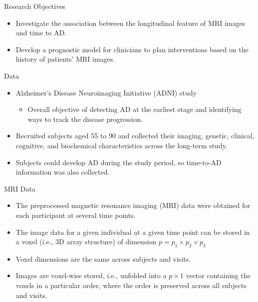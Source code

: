 \documentclass[
  ignorenonframetext,
]{beamer}
\providecommand{\tightlist}{%
  \setlength{\itemsep}{0pt}\setlength{\parskip}{0pt}}
\begin{document}
\begin{frame}{Research Objectives}
\protect\hypertarget{research-objectives}{}
\begin{itemize}
\item
  Investigate the association between the longitudinal feature of MRI
  images and time to AD.
\item
  Develop a prognostic model for clinicians to plan interventions based
  on the history of patients' MRI images.
\end{itemize}
\end{frame}

\begin{frame}{Data}
\protect\hypertarget{data}{}
\begin{itemize}
\item
  Alzheimer's Disease Neuroimaging Initiative (ADNI) study

  \begin{itemize}
  \tightlist
  \item
    Overall objective of detecting AD at the earliest stage and
    identifying ways to track the disease progression.
  \end{itemize}
\item
  Recruited subjects aged 55 to 90 and collected their imaging, genetic,
  clinical, cognitive, and biochemical characteristics across the
  long-term study.
\item
  Subjects could develop AD during the study period, so time-to-AD
  information was also collected.
\end{itemize}
\end{frame}

\begin{frame}{MRI Data}
\protect\hypertarget{mri-data}{}
\begin{itemize}
\item
  The preprocessed magnetic resonance imaging (MRI) data were obtained
  for each participant at several time points.
\item
  The image data for a given individual at a given time point can be
  stored in a voxel (i.e., 3D array structure) of dimension
  \(p= p_1 \times p_2 \times p_3\)
\item
  Voxel dimensions are the same across subjects and visits.
\item
  Images are voxel-wise stored, i.e., unfolded into a \(p\times1\)
  vector containing the voxels in a particular order, where the order is
  preserved across all subjects and visits.
\end{itemize}
\end{frame}
\end{document}
